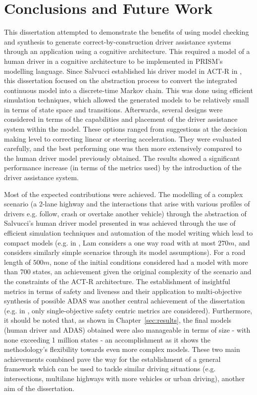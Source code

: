 \chapter{Conclusions and Future Work}
\label{sec:conclusion}

This dissertation attempted to demonstrate the benefits of using model checking and synthesis to generate correct-by-construction driver assistance systems through an application using a cognitive architecture. This required a model of a human driver in a cognitive architecture to be implemented in PRISM's modelling language. Since Salvucci established his driver model in ACT-R in \cite{salvucci_1}, this dissertation focused on the abstraction process to convert the integrated continuous model into a discrete-time Markov chain. This was done using efficient simulation techniques, which allowed the generated models to be relatively small in terms of state space and transitions. Afterwards, several designs were considered in terms of the capabilities and placement of the driver assistance system within the model. These options ranged from suggestions at the decision making level to correcting linear or steering acceleration. They were evaluated carefully, and the best performing one was then more extensively compared to the human driver model previously obtained. The results showed a significant performance increase (in terms of the metrics used) by the introduction of the driver assistance system.

Most of the expected contributions were achieved. The modelling of a complex scenario (a 2-lane highway and the interactions that arise with various profiles of drivers e.g. follow, crash or overtake another vehicle) through the abstraction of Salvucci's human driver model presented in \cite{salvucci_1} was achieved through the use of efficient simulation techniques and automation of the model writing which lead to compact models (e.g. in \cite{lam}, Lam considers a one way road with at most $270m$, and \cite{games} considers similarly simple scenarios through its model assumptions). For a road length of $500m$, none of the initial conditions considered had a model with more than 700 states, an achievement given the original complexity of the scenario and the constraints of the ACT-R architecture. The establishment of insightful metrics in terms of safety and liveness and their application to multi-objective synthesis of possible ADAS was another central achievement of the dissertation (e.g. in \cite{lam}, only single-objective safety centric metrics are considered). Furthermore, it should be noted that, as shown in Chapter~\ref{sec:results}, the final models (human driver and ADAS) obtained were also manageable in terms of size - with none exceeding 1 million states - an accomplishment as it shows the methodology's flexibility towards even more complex models. These two main achievements combined pave the way for the establishment of a general framework which can be used to tackle similar driving situations (e.g. intersections, multilane highways with more vehicles or urban driving), another aim of the dissertation. 

